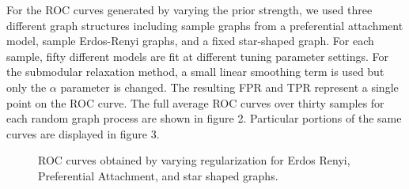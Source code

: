 \documentclass{uwstat572}
\theoremstyle{remark}
\theoremstyle{definition}
\begin{document}
For the ROC curves generated by varying the prior strength, we used three different graph structures including sample graphs from a preferential attachment model, sample Erdos-Renyi graphs, and a fixed star-shaped graph. For each sample, fifty different models are fit at different tuning parameter settings. For the submodular relaxation method, a small linear smoothing term is used but only the $\alpha$ parameter is changed.  The resulting FPR and TPR represent a single point on the ROC curve.  The full average ROC curves over thirty samples for each random graph process are shown in figure 2.  Particular portions of the same curves are displayed in figure 3. 

\begin{figure}
\centering
{}

\caption{ROC curves obtained by varying regularization for Erdos Renyi, Preferential Attachment, and star shaped graphs.}
\label{fig:paramfull}
\end{figure}
\end{document}
